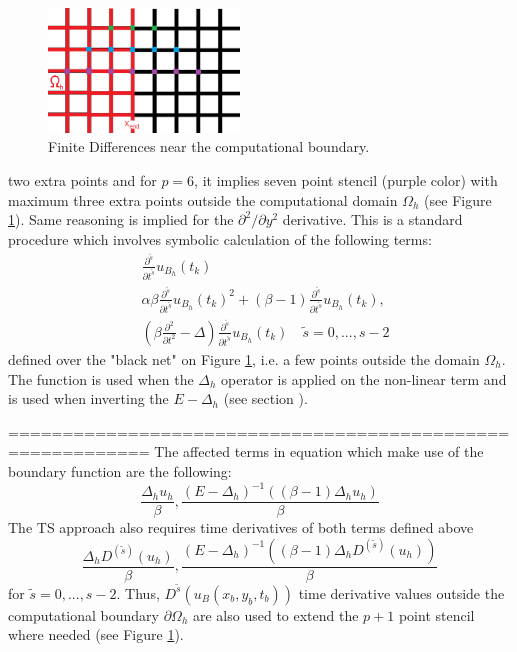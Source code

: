 \documentclass[11pt,a4paper,twoside]{article}
\begin{document}
\begin{figure}[ht]%
\begin{center}
\includegraphics[width=2in]{Pictures/BoundaryPicture.png}
	\caption{Finite Differences near the computational boundary.}
	\label{fig:BoundaryFD}
  \end{center}
\end{figure}
two extra points and for $p=6$, it implies seven point stencil (purple color) with maximum three extra points outside the computational domain $\Omega_h$ (see Figure \ref{fig:BoundaryFD}). Same reasoning is implied for the $\partial^2 / \partial y^2$ derivative. This is a standard procedure which involves symbolic calculation of the following terms:
\begin{align}
& \frac{ \partial^{\tilde s} } { \partial t^{\tilde s} } u_{B_h}(t_k)
\\
& \alpha \beta \frac{ \partial^{\tilde s} } { \partial t^{\tilde s} } u_{B_h}(t_k)^2  + (\beta -1)\frac{ \partial^{\tilde s} } { \partial t^{\tilde s} }u_{B_h}(t_k), \label{nonLinBnd}
\\
& (\beta \frac{ \partial^2 } { \partial t^2 } - \Delta)\frac{ \partial^{\tilde s} } { \partial t^{\tilde s} } u_{B_h}(t_k) \quad \tilde s = 0,...,s-2 \label{psnBnd}
\end{align}
defined over the "black net" on Figure \ref{fig:BoundaryFD}, i.e. a few points outside the domain $\Omega_h$. The function  is used when the $\Delta_h$ operator is applied on the non-linear term and  is used when inverting the $E - \Delta_h$ (see section ).
\iffalse

===========================================================
 The affected terms in equation  which make use of the boundary function  are the following:
\begin{equation*}
\frac{ \Delta_h u_h}{\beta}, \frac{ (E - \Delta_h)^{-1} ( (\beta -1)\Delta_h u_h) }{\beta}
\end{equation*}
The TS approach also requires time derivatives of both terms defined above
\begin{equation*}
\frac{ \Delta_h D^{(\tilde s)} (u_h)}{\beta}, \frac{ (E - \Delta_h)^{-1} ( (\beta -1)\Delta_h D^{(\tilde s)}(u_h) ) }{\beta}
\end{equation*}
for $\tilde s = 0, ..., s-2$.  Thus, $D^{\tilde s}(u_B(x_b , y_b, t_b))$  time derivative values outside the computational boundary $\partial \Omega_h$ are also used to extend the $p+1$ point stencil where needed (see Figure  \ref{fig:BoundaryFD}). 
\end{document}
